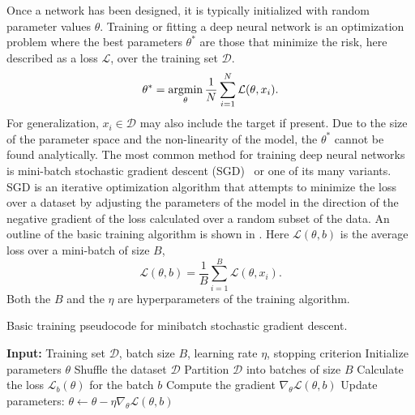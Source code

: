 Once a network has been designed, it is typically initialized with random parameter values $\theta$.
Training or fitting a deep neural network is an optimization problem where the best parameters $\theta^*$ are those that minimize the risk, here described as a loss $\mathcal{L}$, over the training set $\mathcal{D}$.
\begin{equation}
    \theta^* = \operatorname*{argmin}_{\theta} \frac{1}{N} \sum_{i=1}^N \mathcal{L}(\theta, x_i).
\end{equation}
For generalization, $x_i \in \mathcal{D}$ may also include the target if present.
Due to the size of the parameter space and the non-linearity of the model, the $\theta^*$ cannot be found analytically.
The most common method for training deep neural networks is mini-batch stochastic gradient descent (SGD)~\cite{Perceptron} or one of its many variants.
SGD is an iterative optimization algorithm that attempts to minimize the loss over a dataset by adjusting the parameters of the model in the direction of the negative gradient of the loss calculated over a random subset of the data.
An outline of the basic training algorithm is shown in .
Here $\mathcal{L}(\theta, b)$ is the average loss over a mini-batch of size $B$,
\begin{equation}
    \mathcal{L}(\theta, b) = \frac{1}{B} \sum_{i=1}^B \mathcal{L}(\theta, x_i).
\end{equation}
Both the $B$ and the $\eta$ are hyperparameters of the training algorithm.

\begin{algorithm}
    \caption{Basic training pseudocode for minibatch stochastic gradient descent.}
    \label{alg:gradient_descent}
    \begin{algorithmic}[1]
        \State \textbf{Input:} Training set $\mathcal{D}$, batch size $B$, learning rate $\eta$, stopping criterion
        \State Initialize parameters $\theta$
        \Repeat {}
        \State Shuffle the dataset $\mathcal{D}$
        \State Partition $\mathcal{D}$ into batches of size $B$
        \State Calculate the loss $\mathcal{L}_b(\theta)$ for the batch $b$
        \State Compute the gradient $\nabla_\theta \mathcal{L}(\theta, b)$
        \State Update parameters: $\theta \gets \theta - \eta \nabla_\theta \mathcal{L}(\theta, b)$
        \EndFor
    \end{algorithmic}
\end{algorithm}

